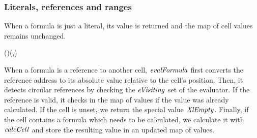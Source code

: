 \subsubsection{Literals, references and ranges}

When a formula is just a literal, its value is returned and the
map of cell values remains unchanged.

\begin{hscode}\SaveRestoreHook
{}%
%
\>[B]{}\;\;\;(\;)\mathrel{=}(,){}\<[E]%
\ColumnHook
\end{hscode}\resethooks

When a formula is a reference to another cell, \ensuremath{\Varid{evalFormula}} first converts
the reference address to its absolute value relative to the cell's position.
Then, it detects circular references by checking the \ensuremath{\Varid{eVisiting}} set of the
evaluator. If the reference is valid, it checks in the map of values if the
value was already calculated. If the cell is unset, we return the special
value \ensuremath{\Conid{XlEmpty}}. Finally, if the cell contains a formula which needs to be
calculated, we calculate it with \ensuremath{\Varid{calcCell}} and store the resulting value in
an updated map of values.

